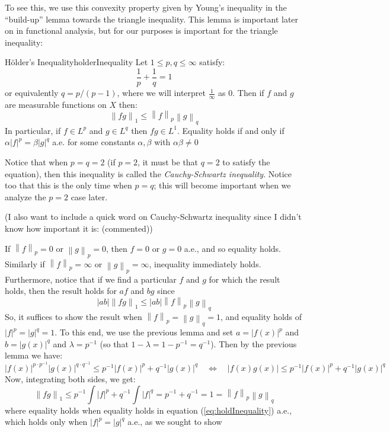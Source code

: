 \documentclass[oneside]{book}
\newcommand{\LRw}{\Leftrightarrow}
\begin{document}
To see this, we use this convexity property given by Young's inequality in the ``build-up'' lemma towards the triangle
inequality. This lemma is important later on in functional analysis, but for our purposes is important for the triangle
inequality:

\begin{thm}{H\"older's Inequality}{holderInequality}
	Let $1 \le p,q \le \infty$ satisfy:
	\[
		\frac{1}{p} + \frac{1}{q} = 1
	\]
	or equivalently $q = p/(p-1)$, where we will interpret $\frac{1}{\infty}$ as $0$. Then if $f$ and $g$ are measurable
	functions on $X$ then:
	\[
		\left\| fg\right\|_1 \le \left\| f\right\|_p \left\|g\right\|_q
	\]
	In particular, if $f \in L^p$ and $g \in L^q$ then $fg \in L^1$. Equality holds if and only if $\alpha|f|^p
	= \beta|g|^q$ a.e. for some constants $\alpha, \beta$ with $\alpha\beta \ne 0$
\end{thm}
Notice that when $p = q = 2$ (if $p = 2$, it must be that $q = 2$ to satisfy the equation), then this inequality is
called the \emph{Cauchy-Schwartz inequality}. Notice too that this is the only time when $p = q$; this will become
important when we analyze the $p = 2$ case later. 

(I also want to include a quick word on Cauchy-Schwartz inequality since I didn't know how important it is: (commented))

\begin{Proof}
	If $\left\| f\right\|_p = 0$ or $\left\| g\right\|_p =  0$, then $f = 0$ or $g= 0$ a.e., and so equality holds.
	Similarly if $\left\| f\right\|_p = \infty$ or $\left\| g\right\|_p = \infty$, inequality immediately holds. Furthermore, notice that if we find
	a particular $f$ and $g$ for which the result holds, then the result holds for $af$ and $bg$ since
	\[
		|ab|\left\|fg\right\|_1 \le |ab|\left\|f\right\|_p\left\|g\right\|_q
	\]
	So, it suffices to show the result when $\left\|f\right\|_p = \left\| g\right\|_q = 1$, and equality holds of $|f|^p
	= |g|^q = 1$. To this end, we use the previous lemma and set $a = |f(x)|^p$ and $b = |g(x)|^q$ and $\lambda
	= p^{-1}$ (so that $1-\lambda = 1-p^{-1} = q^{-1}$). Then by the previous lemma we have:
	\begin{equation}\label{eq:holdInequality}
		|f(x)|^{p\cdot p^{-1}}|g(x)|^{q\cdot q^{-1}} \le p^{-1}|f(x)|^p + q^{-1}|g(x)|^q\quad \LRw\quad |f(x)g(x)| \le p^{-1}|f(x)|^p + q^{-1}|g(x)|^q
	\end{equation}
	Now, integrating both sides, we get:
	\[
		\left\| fg\right\|_1 \le p^{-1}\int |f|^p + q^{-1}\int |f|^q = p^{-1} + q^{-1} = 1 = \left\| f\right\|_p \left\|
		g\right\|_q
	\]
	where equality holds when equality holds in equation (\ref{eq:holdInequality}) a.e., which holds only when $|f|^p
	= |g|^q$ a.e., as we sought to show
\end{Proof}
\end{document}
